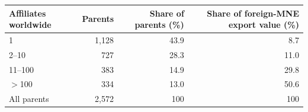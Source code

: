 \begin{tabular}{lrrr}
\toprule
Affiliates worldwide & Parents & Share of parents (\%) & Share of foreign-MNE export value (\%) \\
\midrule
1 & 1,128 & 43.9 & 8.7 \\
2--10 & 727 & 28.3 & 11.0 \\
11--100 & 383 & 14.9 & 29.8 \\
$>$100 & 334 & 13.0 & 50.6 \\
\midrule
All parents & 2,572 & 100 & 100 \\
\bottomrule
\end{tabular}

